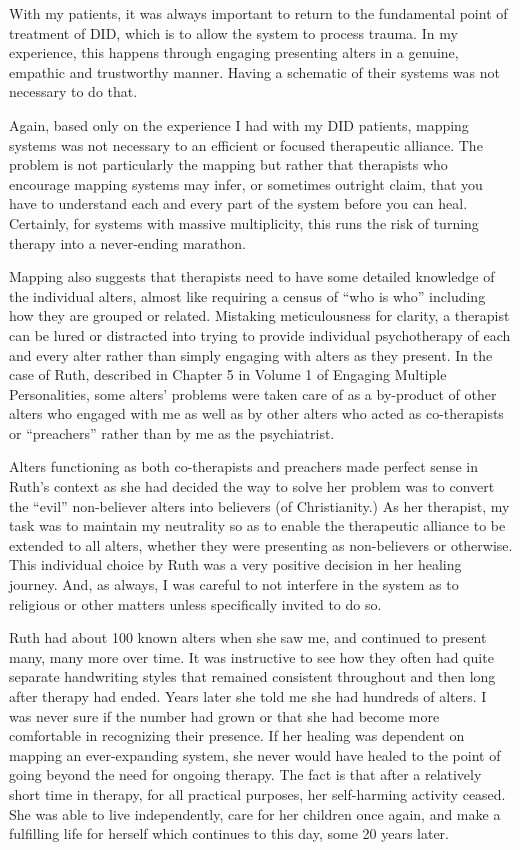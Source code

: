 \documentclass[]{book}
\begin{document}
With my patients, it was always important to return to the fundamental point of treatment of DID, which is to allow the system to process trauma. In my experience, this happens through engaging presenting alters in a genuine, empathic and trustworthy manner. Having a schematic of their systems was not necessary to do that.

Again, based only on the experience I had with my DID patients, mapping systems was not necessary to an efficient or focused therapeutic alliance. The problem is not particularly the mapping but rather that therapists who encourage mapping systems may infer, or sometimes outright claim, that you have to understand each and every part of the system before you can heal. Certainly, for systems with massive multiplicity, this runs the risk of turning therapy into a never-ending marathon.

Mapping also suggests that therapists need to have some detailed knowledge of the individual alters, almost like requiring a census of ``who is who'' including how they are grouped or related. Mistaking meticulousness for clarity, a therapist can be lured or distracted into trying to provide individual psychotherapy of each and every alter rather than simply engaging with alters as they present. In the case of Ruth, described in Chapter 5 in Volume 1 of Engaging Multiple Personalities, some alters' problems were taken care of as a by-product of other alters who engaged with me as well as by other alters who acted as co-therapists or ``preachers'' rather than by me as the psychiatrist.

Alters functioning as both co-therapists and preachers made perfect sense in Ruth's context as she had decided the way to solve her problem was to convert the ``evil'' non-believer alters into believers (of Christianity.) As her therapist, my task was to maintain my neutrality so as to enable the therapeutic alliance to be extended to all alters, whether they were presenting as non-believers or otherwise. This individual choice by Ruth was a very positive decision in her healing journey. And, as always, I was careful to not interfere in the system as to religious or other matters unless specifically invited to do so.

Ruth had about 100 known alters when she saw me, and continued to present many, many more over time. It was instructive to see how they often had quite separate handwriting styles that remained consistent throughout and then long after therapy had ended. Years later she told me she had hundreds of alters. I was never sure if the number had grown or that she had become more comfortable in recognizing their presence. If her healing was dependent on mapping an ever-expanding system, she never would have healed to the point of going beyond the need for ongoing therapy. The fact is that after a relatively short time in therapy, for all practical purposes, her self-harming activity ceased. She was able to live independently, care for her children once again, and make a fulfilling life for herself which continues to this day, some 20 years later.
\end{document}
